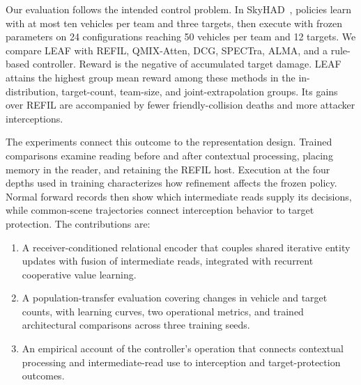 Our evaluation follows the intended control problem. In SkyHAD~\cite{skyhad2026}, policies learn with at most ten vehicles per team and three targets, then execute with frozen parameters on 24 configurations reaching 50 vehicles per team and 12 targets. We compare LEAF with REFIL, QMIX-Atten, DCG, SPECTra, ALMA, and a rule-based controller. Reward is the negative of accumulated target damage. LEAF attains the highest group mean reward among these methods in the in-distribution, target-count, team-size, and joint-extrapolation groups. Its gains over REFIL are accompanied by fewer friendly-collision deaths and more attacker interceptions.

The experiments connect this outcome to the representation design. Trained comparisons examine reading before and after contextual processing, placing memory in the reader, and retaining the REFIL host. Execution at the four depths used in training characterizes how refinement affects the frozen policy. Normal forward records then show which intermediate reads supply its decisions, while common-scene trajectories connect interception behavior to target protection. The contributions are:
\begin{enumerate}
\item A receiver-conditioned relational encoder that couples shared iterative entity updates with fusion of intermediate reads, integrated with recurrent cooperative value learning.
\item A population-transfer evaluation covering changes in vehicle and target counts, with learning curves, two operational metrics, and trained architectural comparisons across three training seeds.
\item An empirical account of the controller's operation that connects contextual processing and intermediate-read use to interception and target-protection outcomes.
\end{enumerate}

